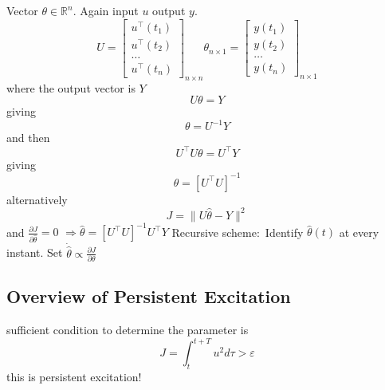 \begin{example}
  Vector $\theta\in\mathbb{R}^{n}$.
  Again input $u$ output $y$.
  \begin{equation*}
    U=
    \begin{bmatrix}
      u^{\top}(t_{1}) \\
      u^{\top}(t_{2}) \\
      \dots \\
      u^{\top}(t_{n})
    \end{bmatrix}_{n\times n}
    \theta_{n\times 1}=
    \begin{bmatrix}
      y(t_{1}) \\
      y(t_{2}) \\
      \dots \\
      y(t_{n})
    \end{bmatrix}_{n\times 1}
  \end{equation*}
  where the output vector is $Y$
  \begin{equation*}
    U\theta=Y
  \end{equation*}
  giving
  \begin{equation*}
    \theta=U^{-1}Y
  \end{equation*}
  and then
  \begin{equation*}
    U^{\top}U\theta=U^{\top}Y
  \end{equation*}
  giving
  \begin{equation*}
    \theta=[U^{\top}U]^{-1}
  \end{equation*}
  alternatively
  \begin{equation*}
    J=\|U\hat{\theta}-Y\|^{2}
  \end{equation*}
  and $\frac{\partial{}J}{\partial{}\hat{\theta}}=0$ $\Rightarrow \hat{\theta}=[U^{\top}U]^{-1}U^{\top}Y$
  Recursive scheme:\ Identify $\hat{\theta}(t)$ at every instant.
  Set $\dot{\hat{\theta}}\propto\frac{\partial{}J}{\partial{}\theta}$
\end{example}

\subsection{Overview of Persistent Excitation}

sufficient condition to determine the parameter is
\begin{equation*}
  J=\int_{t}^{t+T}u^{2}d\tau>\varepsilon
\end{equation*}
this is persistent excitation!

